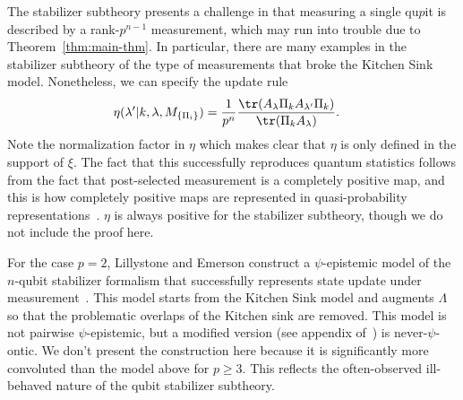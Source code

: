 \documentclass[%
 reprint,
superscriptaddress,
nofootinbib,
 amsmath,amssymb,
 prx, 
 accepted=2019-09-27,
]{quantumarticle}
\begin{document}
The stabilizer subtheory presents a challenge in that measuring a
single qu$p$it is described by a rank-$p^{n-1}$ measurement, which may
run into trouble due to Theorem~\ref{thm:main-thm}. In particular,
there are many examples in the stabilizer subtheory of the type of
measurements that broke the Kitchen Sink model. Nonetheless, we can
specify the update rule
\begin{align}
  \eta(\lambda'|k,\lambda,M_{\{\Pi_i\}}) &= \frac{1}{p^n}\frac{\tr(A_\lambda\Pi_k A_{\lambda'}\Pi_k)}{\tr(\Pi_kA_\lambda)}.
\end{align}
Note the normalization factor in $\eta$ which makes clear that $\eta$
is only defined in the support of $\xi$. The fact that this
successfully reproduces quantum statistics follows from the fact that
post-selected measurement is a completely positive map, and this is
how completely positive maps are represented in quasi-probability
representations~\cite{FerrieQuasiprobabilityrepresentationsquantum2011}.
$\eta$ is always positive for the stabilizer subtheory, though we do
not include the proof here.
 
For the case $p=2$, Lillystone and Emerson construct a 
$\psi$-epistemic model of the $n$-qubit stabilizer formalism that
successfully represents state update under
measurement~\cite{LillystoneContextualpsEpistemicModel2019}. This model starts
from the Kitchen Sink model and augments $\Lambda$ so that the
problematic overlaps of the Kitchen sink are removed. This model is
not pairwise $\psi$-epistemic, but a modified version (see appendix
of~\cite{LillystoneContextualpsEpistemicModel2019}) is never-$\psi$-ontic. We
don't present the construction here because it is significantly more
convoluted than the model above for $p\geq3$. This reflects the
often-observed ill-behaved nature of the qubit stabilizer subtheory.
\end{document}
